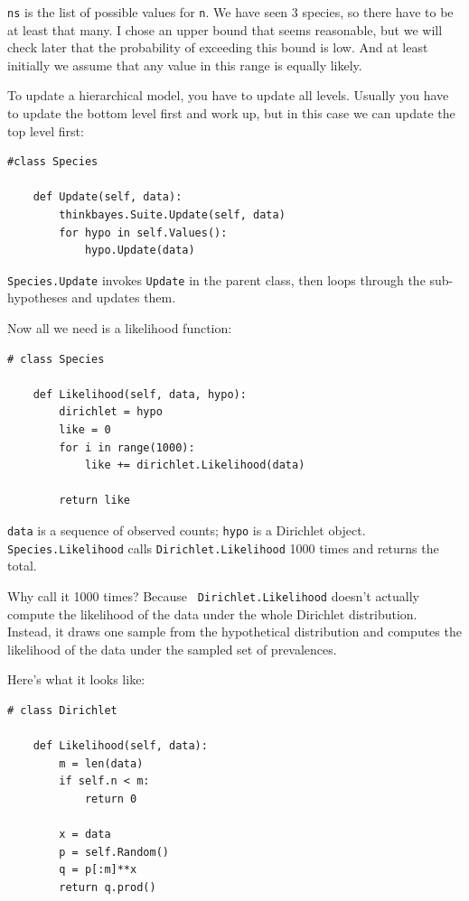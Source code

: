 \documentclass[12pt]{book}
\begin{document}
{\tt ns} is the list of possible values for {\tt n}.  We have seen 3
species, so there have to be at least that many.  I chose an upper
bound that seems reasonable, but we will check later that the
probability of exceeding this bound is low.  And at least initially
we assume that any value in this range is equally likely.

To update a hierarchical model, you have to update all levels.
Usually you have to update the bottom
level first and work up, but in this case we can
update the top level first:

\begin{verbatim}
#class Species

    def Update(self, data):
        thinkbayes.Suite.Update(self, data)
        for hypo in self.Values():
            hypo.Update(data)
\end{verbatim}

{\tt Species.Update} invokes {\tt Update} in the parent class,
then loops through the sub-hypotheses and updates them.

Now all we need is a likelihood function:

\begin{verbatim}
# class Species

    def Likelihood(self, data, hypo):
        dirichlet = hypo
        like = 0
        for i in range(1000):
            like += dirichlet.Likelihood(data)

        return like
\end{verbatim}

{\tt data} is a sequence of
observed counts; {\tt hypo} is a Dirichlet object.
{\tt Species.Likelihood} calls
{\tt Dirichlet.Likelihood} 1000 times and returns the total.

Why call it 1000 times?  Because {\tt
  Dirichlet.Likelihood} doesn't actually compute the likelihood of the
data under the whole Dirichlet distribution.  Instead, it draws one
sample from the hypothetical distribution and computes the likelihood
of the data under the sampled set of prevalences.

Here's what it looks like:

\begin{verbatim}
# class Dirichlet

    def Likelihood(self, data):
        m = len(data)
        if self.n < m:
            return 0

        x = data
        p = self.Random()
        q = p[:m]**x
        return q.prod()
\end{verbatim}
\end{document}
